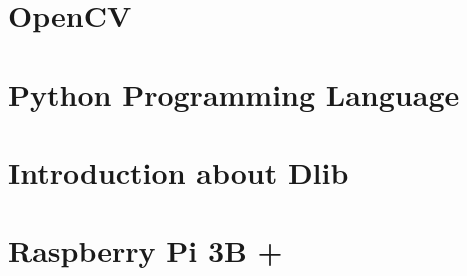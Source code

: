\section{OpenCV}

\section{Python Programming Language}

\section{Introduction about Dlib}

\section{Raspberry Pi 3B +}